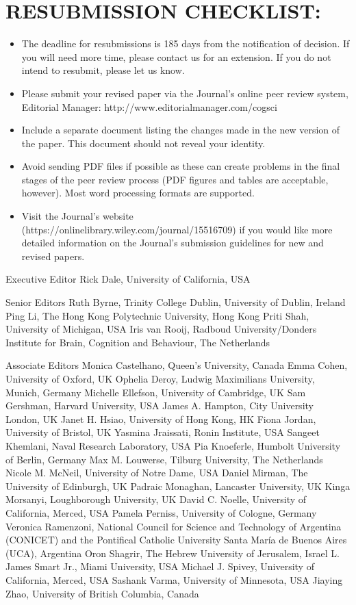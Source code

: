 \documentclass{article}
\begin{document}
\section{RESUBMISSION CHECKLIST:}

\begin{itemize}
\item  The deadline for resubmissions is 185 days from the notification of decision. If you will need more time, please contact us for an extension. If you do not intend to resubmit, please let us know.

\item Please submit your revised paper via the Journal's online peer review system, Editorial Manager: http://www.editorialmanager.com/cogsci

\item Include a separate document listing the changes made in the new version of the paper. This document should not reveal your identity.

\item Avoid sending PDF files if possible as these can create problems in the final stages of the peer review process (PDF figures and tables are acceptable, however). Most word processing formats are supported.

\item Visit the Journal's website (https://onlinelibrary.wiley.com/journal/15516709) if you would like more detailed information on the Journal's submission guidelines for new and revised papers.
\end{itemize}

Executive Editor
Rick Dale, University of California, USA

Senior Editors
Ruth Byrne, Trinity College Dublin, University of Dublin, Ireland
Ping Li, The Hong Kong Polytechnic University, Hong Kong
Priti Shah, University of Michigan, USA
Iris van Rooij, Radboud University/Donders Institute for Brain, Cognition and Behaviour, The Netherlands

Associate Editors
Monica Castelhano, Queen's University, Canada
Emma Cohen, University of Oxford, UK
Ophelia Deroy, Ludwig Maximilians University, Munich, Germany
Michelle Ellefson, University of Cambridge, UK
Sam Gershman, Harvard University, USA
James A. Hampton, City University London, UK
Janet H. Hsiao, University of Hong Kong, HK
Fiona Jordan, University of Bristol, UK
Yasmina Jraissati, Ronin Institute, USA
Sangeet Khemlani, Naval Research Laboratory, USA
Pia Knoeferle, Humbolt University of Berlin, Germany
Max M. Louwerse, Tilburg University, The Netherlands
Nicole M. McNeil, University of Notre Dame, USA
Daniel Mirman, The University of Edinburgh, UK
Padraic Monaghan, Lancaster University, UK
Kinga Morsanyi, Loughborough University, UK
David C. Noelle, University of California, Merced, USA
Pamela Perniss, University of Cologne, Germany
Veronica Ramenzoni, National Council for Science and Technology of Argentina (CONICET) and the Pontifical Catholic University Santa María de Buenos Aires (UCA), Argentina
Oron Shagrir, The Hebrew University of Jerusalem, Israel
L. James Smart Jr., Miami University, USA
Michael J. Spivey, University of California, Merced, USA
Sashank Varma, University of Minnesota, USA
Jiaying Zhao, University of British Columbia, Canada
\end{document}
